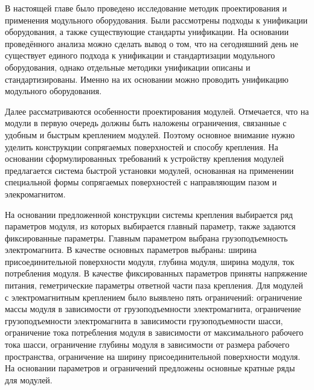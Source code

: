 В настоящей главе было проведено исследование методик проектирования и применения модульного оборудования. Были рассмотрены подходы к унификации оборудования, а также существующие стандарты унификации. На основании проведённого анализа можно сделать вывод о том, что на сегодняшний день не существует единого подхода к унификации и стандартизации модульного оборудования, однако отдельные методики унификации описаны и стандартизированы. Именно на их основании можно проводить унификацию модульного оборудования. 

Далее рассматриваются особенности проектирования модулей. Отмечается, что на модули в первую очередь должны быть наложены ограничения, связанные с удобным и быстрым креплением модулей. Поэтому основное внимание нужно уделить конструкции сопрягаемых поверхностей и способу крепления. На основании сформулированных требований к устройству крепления модулей предлагается система быстрой установки модулей, основанная на применении специальной формы сопрягаемых поверхностей с направляющим пазом и элекромагнитом.

На основании предложенной конструкции системы крепления выбирается ряд параметров модуля, из которых выбирается главный параметр, также задаются фиксированные параметры. Главным параметром выбрана грузоподъемность электромагнита. В качестве основных параметров выбраны: ширина присоединительной поверхности модуля, глубина модуля, ширина модуля, ток потребления модуля. В качестве фиксированных параметров приняты напряжение питания, геметрические параметры ответной части паза крепления. Для модулей с электромагнитным креплением было выявлено пять ограничений: ограничение массы модуля в зависимости от грузоподъемности электромагнита, ограничение грузоподъемности электромагнита в зависимости грузоподъемности шасси, ограничение тока потребления модуля в зависимости от максимального рабочего тока шасси, ограничение глубины модуля в зависимости от размера рабочего пространства, ограничение на ширину присоединительной поверхности модуля. На основании параметров и ограничений предложены основные кратные ряды для модулей.

